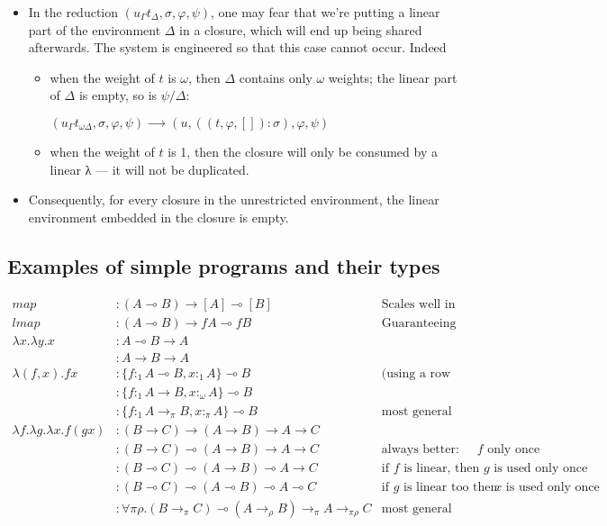 \documentclass[11pt]{article}
\begin{document}
\begin{itemize}
\item In the reduction \((u_Γ t_Δ,σ,φ,ψ)\), one may fear that we're
putting a linear part of the environment \(Δ\) in a closure, which will
end up being shared afterwards. The system is engineered so that
this case cannot occur. Indeed
\begin{itemize}
\item when the weight of \(t\) is \(ω\), then \(Δ\) contains only \(ω\) weights; the
linear part of \(Δ\) is empty, so is \(ψ/Δ\):

\((u_Γ t_{ωΔ},σ,φ,ψ)          ⟶ (u,((t,φ,[]):σ),φ,ψ)\)

\item when the weight of \(t\) is 1, then the closure will only be consumed
by a linear λ --- it will not be duplicated.
\end{itemize}

\item Consequently, for every closure in the unrestricted environment, the
linear environment embedded in the closure is empty.
\end{itemize}


\subsection{Examples of simple programs and their types}

\hspace{-4cm}\begin{minipage}{\textwidth}
\begin{align*}
map & : (A ⊸ B) → [A] ⊸ [B] & \text{Scales well in unrestricted contexts}\\
lmap & : (A ⊸ B) → f A ⊸ f B & \text{Guaranteeing that no element is lost} \\
λx. λy. x & : A ⊸ B → A \\
          & : A → B → A \\
λ(f,x). f x & : \{f :_1 A ⊸ B, x :_1 A\} ⊸ B & \text{(using a row type for concision)}\\
            & : \{f :_1 A → B, x :_ω A\} ⊸ B \\
            & : \{f :_1 A →_π B, x :_π A\} ⊸ B & \text{most general type} \\ 
λf. λg. λx. f (g x) & : (B → C) → (A → B) → A → C \\
                    & : (B → C) ⊸ (A → B) → A → C & \text {always better: comp uses $f$  only once} \\
                    & : (B ⊸ C) ⊸ (A → B) ⊸ A → C & \text {if $f$ is linear, then $g$ is used only once} \\
                    & : (B ⊸ C) ⊸ (A ⊸ B) ⊸ A ⊸ C & \text {if $g$ is linear too then $x$ is used only once} \\
                    & : ∀ π ρ. (B →_π C) ⊸ (A →_ρ B) →_π A →_{πρ} C & \text{most general type} \\
\end{align*}
\end{minipage}
\end{document}
